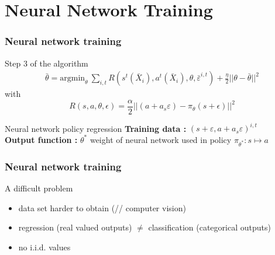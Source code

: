 \documentclass[mathserif]{beamer}
\begin{document}


\section{Neural Network Training}

\begin{frame}
  \frametitle{{Neural network training}}
  \begin{block}{Step 3 of the algorithm}
	\begin{align*}
\bar{\theta} = \text{argmin}_{\theta} ~\sum_{i,t} R(s^t(\bar{X}_i),a^t(\bar{X}_i),\theta,\bar{\varepsilon}^{i,t}) + \frac{\eta}{2}||\theta-\bar{\theta}||^2
	\end{align*}  
	with 
	\[
	 R(s,a,\theta,\epsilon) = \frac{\alpha}{2}||(a+a_s\varepsilon) - \pi_{\theta}(s+\epsilon)||^2
	 \]
  \end{block}
  
  \begin{block}{Neural network policy regression}
  \textbf{Training data : } $(s + \varepsilon, a + a_{s}\varepsilon)^{i,t}$ \\
  \vspace{10pt}
  \textbf{Output function : }  $\theta^{*}$ weight of neural network used in policy $\pi_{\theta^{*}} : s \mapsto a$
  
  \end{block}
\end{frame}



\begin{frame}
  \frametitle{{Neural network training}}
  \begin{block}{A difficult problem}
\begin{itemize}
\item data set harder to obtain (// computer vision)
\item regression (real valued outputs) $\not=$ classification (categorical outputs)
\item no i.i.d. values 
\end{itemize}
  \end{block}

\end{frame}
\end{document}
